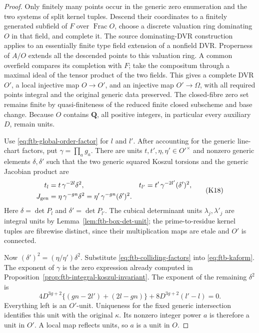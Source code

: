 \begin{proof}
Only finitely many points occur in the generic zero enumeration and
the two systems of split kernel tuples.
Descend their coordinates to a finitely generated subfield of \(F\)
over \(\operatorname{Frac}O\), choose a discrete valuation ring
dominating \(O\) in that field, and complete it.
The source dominating-DVR construction applies to an essentially
finite type field extension of a nonfield DVR.
Properness of \(A/O\) extends all the descended points to this
valuation ring.  A common overfield compares its completion with
\(F\); take the compositum through a maximal ideal of the tensor
product of the two fields.
This gives a complete DVR \(O'\), a local injective map \(O\to O'\),
and an injective map \(O'\to\Omega\), with all required points
integral and the original generic data preserved.
The closed-fibre zero set remains finite by quasi-finiteness of
the reduced finite closed subscheme and base change.
Because \(O\) contains \(\mathbf Q\), all positive integers,
in particular every auxiliary \(D\), remain units.

Use \eqref{eq:ftb-global-order-factor} for \(l\) and \(l'\).
After accounting for the generic line-chart factors, put
\(\gamma=\prod_a g_a\).
There are units \(t,t',\eta,\eta'\in O'^\times\) and nonzero
generic elements \(\delta,\delta'\) such that the two generic
squared Koszul torsions and the generic Jacobian product are
\[
 \begin{aligned}
 t_l&=t\,\gamma^{-2l}\delta^2,&
 t_{l'}&=t'\,\gamma^{-2l'}(\delta')^2,\\
 J_{\rm gen}&=\eta\,\gamma^{-gn}\delta^2
            =\eta'\,\gamma^{-gn}(\delta')^2 .
 \end{aligned}                                      \tag{K18}\label{eq:ftb-colliding-factors}
\]
Here \(\delta=\det P_l\) and \(\delta'=\det P_{l'}\).
The cubical determinant units \(\lambda_j,\lambda'_j\) are integral
units by Lemma~\ref{lem:ftb-box-det-unit}; the prime-to-residue
kernel tuples are fibrewise distinct, since their multiplication
maps are etale and \(O'\) is connected.

Now \((\delta')^2=(\eta/\eta')\delta^2\).
Substitute \eqref{eq:ftb-colliding-factors} into
\eqref{eq:ftb-kaform}.
The exponent of \(\gamma\) is the zero expression already computed
in Proposition~\ref{prop:ftb-integral-koszul-invariant}.
The exponent of the remaining \(\delta^2\) is
\[
 4D^{3g+2}\{(gn-2l')+(2l-gn)\}
                    +8D^{3g+2}(l'-l)=0 .
\]
Everything left is an \(O'\)-unit.  Uniqueness for the fixed generic
intersection identifies this unit with the original \(\kappa\).
Its nonzero integer power \(a\) is therefore a unit in \(O'\).
A local map reflects units, so \(a\) is a unit in \(O\).
\end{proof}


